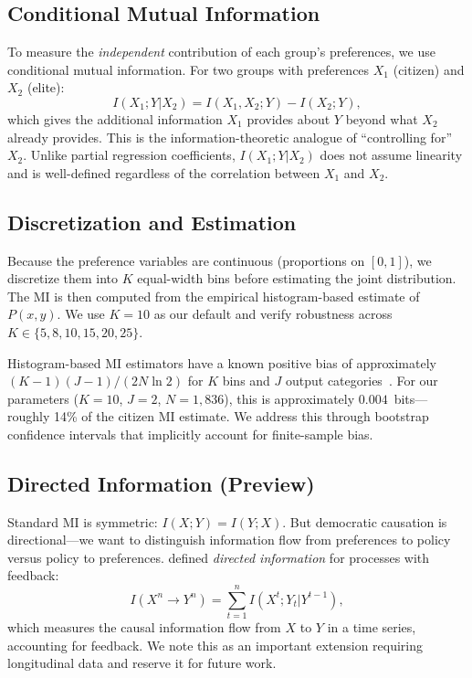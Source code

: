 \documentclass[twocolumn,10pt]{article}
\begin{document}
\subsection{Conditional Mutual Information}

To measure the \emph{independent} contribution of each group's preferences, we use conditional mutual information.  For two groups with preferences $X_1$ (citizen) and $X_2$ (elite):
\begin{equation}
I(X_1; Y | X_2) = I(X_1, X_2; Y) - I(X_2; Y),
\label{eq:cmi}
\end{equation}
which gives the additional information $X_1$ provides about $Y$ beyond what $X_2$ already provides.  This is the information-theoretic analogue of ``controlling for'' $X_2$.  Unlike partial regression coefficients, $I(X_1; Y | X_2)$ does not assume linearity and is well-defined regardless of the correlation between $X_1$ and $X_2$.

\subsection{Discretization and Estimation}

Because the preference variables are continuous (proportions on $[0,1]$), we discretize them into $K$ equal-width bins before estimating the joint distribution.  The MI is then computed from the empirical histogram-based estimate of $P(x,y)$.  We use $K = 10$ as our default and verify robustness across $K \in \{5, 8, 10, 15, 20, 25\}$.

Histogram-based MI estimators have a known positive bias of approximately $(K-1)(J-1)/(2N\ln 2)$ for $K$ bins and $J$ output categories~\citep{miller1955}.  For our parameters ($K=10$, $J=2$, $N=1{,}836$), this is approximately $0.004$~bits---roughly 14\% of the citizen MI estimate.  We address this through bootstrap confidence intervals that implicitly account for finite-sample bias.

\subsection{Directed Information (Preview)}

Standard MI is symmetric: $I(X;Y) = I(Y;X)$.  But democratic causation is directional---we want to distinguish information flow from preferences to policy versus policy to preferences.  \citet{massey1990} defined \emph{directed information} for processes with feedback:
\begin{equation}
I(X^n \to Y^n) = \sum_{t=1}^{n} I(X^t; Y_t | Y^{t-1}),
\label{eq:directed}
\end{equation}
which measures the causal information flow from $X$ to $Y$ in a time series, accounting for feedback.  We note this as an important extension requiring longitudinal data and reserve it for future work.
\end{document}
